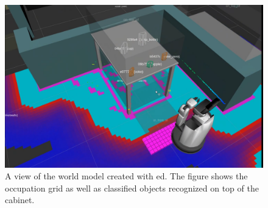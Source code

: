 \begin{figure}[h]
\centering
	\includegraphics[width = 0.8\linewidth]{Figures/ed_segmentation_hsr}
	\caption{A view of the world model created with \acrshort{ed}. The figure shows the occupation grid as well as classified objects recognized on top of the cabinet.}
	\label{fig:ed_segmentation}
\end{figure}
